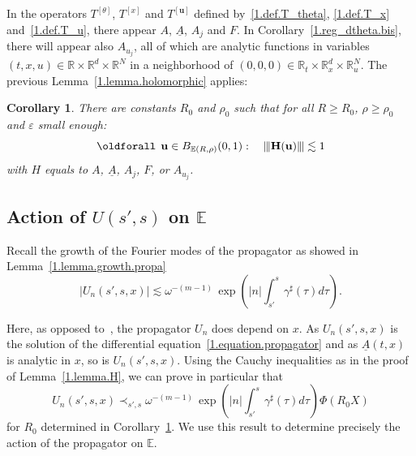 \documentclass[10pt]{amsart}
\newtheorem{coro}[cdrthm]{Corollary}
\theoremstyle{definition}
\theoremstyle{plain}
\newcommand*\e{\varepsilon}
\newcommand*\R{{\mathbb R}}
\newcommand*\EE{{\mathbb E}}
\newcommand*\g{\gamma}
\newcommand{\ubf}{{\mathbf u}}
\newcommand{\Hbf}{{\mathbf H}}
\newcommand*\und{\underline}
\DeclarePairedDelimiter{\VERT}{|\mkern -1.6mu|\mkern -1.6mu|}{|\mkern -1.6mu|\mkern -1.6mu|}
\renewcommand*{\forall}{\mathrel{\oldforall}}
\begin{document}
In the operators $T^{[\theta]}$, $T^{[x]} $ and $T^{[\ubf]} $ defined by~\eqref{1.def.T_theta}, \eqref{1.def.T_x} and~\eqref{1.def.T_u}, there appear $A$, $\und{A}$, $A_{j}$ and $F$. In Corollary~\ref{1.reg_dtheta.bis}, there will appear also $A_{u_j}$, all of which are analytic functions in variables $(t,x,u)\in\R\times\R^{d}\times\R^{N}$ in a neighborhood of $(0,0,0) \in \R_{t}\times\R_{x}^{d}\times\R_{u}^{N}$. The previous Lemma~\ref{1.lemma.holomorphic} applies:

\begin{coro}\label{1.coro.norms}
There are constants $R_0$ and $\rho_0$ such that for all $R\geq R_0$, $\rho \geq \rho_0$ and $\e$ small enough:
\begin{equation}\label{1.action.A}
\forall \,\ubf\in B_{\EE(R,\rho)}(0,1): \quad \VERT{\Hbf(\ubf)} \lesssim 1
\end{equation}
with $H$ equals to $A$, $\und{A}$, $A_j$, $F$, or $A_{u_j}$.
\end{coro}



\subsection{Action of \texorpdfstring{$U(s',s)$}{U(s',s)} on \texorpdfstring{$\EE$}{EE}}

Recall the growth of the Fourier modes of the propagator as showed in Lemma~\ref{1.lemma.growth.propa}
\[
|U_n(s',s,x)| \lesssim \omega^{-(m-1)}\,\exp\left(|n| \int_{s'}^{s} \g^{\sharp}(\tau) d\tau \right).
\]

Here, as opposed to~\cite{metivier2005remarks}, the propagator $U_n$ does depend on $x$. As $U_n(s',s,x)$ is the solution of the differential equation~\eqref{1.equation.propagator} and as $\und{A}(t,x)$ is analytic in $x$, so is $U_n(s',s,x)$. Using the Cauchy inequalities as in the proof of Lemma~\ref{1.lemma.H}, we can prove in particular that
\begin{equation}\label{1.esti.prec.propa}
U_n(s',s,x) \prec_{s',s} \omega^{-(m-1)}\,\exp\left(|n| \int_{s'}^{s} \g^{\sharp}(\tau) d\tau \right) \Phi(R_0 X)
\end{equation}
for $R_0$ determined in Corollary~\ref{1.coro.norms}. We use this result to determine precisely the action of the propagator on $\EE$.
\end{document}

